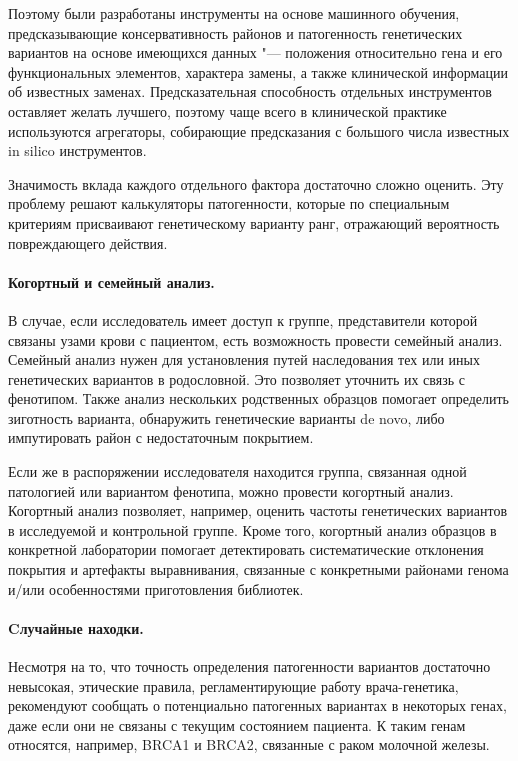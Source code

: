 \documentclass[a4paper,12pt]{article}
\begin{document}
\begin{enumerate}
Поэтому были разработаны инструменты на основе машинного обучения, предсказывающие консервативность районов и патогенность генетических вариантов на основе имеющихся данных "--- положения относительно гена и его функциональных элементов, характера замены, а также клинической информации об известных заменах\cite{brea-fernandez}.
Предсказательная способность отдельных инструментов оставляет желать лучшего, поэтому чаще всего в клинической практике используются агрегаторы, собирающие предсказания с большого числа известных in silico инструментов.
\end{enumerate}

Значимость вклада каждого отдельного фактора достаточно сложно оценить.
Эту проблему решают калькуляторы патогенности, которые по специальным критериям присваивают генетическому варианту ранг, отражающий вероятность повреждающего действия\cite{ryzhkova}.

\paragraph{Когортный и семейный анализ.}
В случае, если исследователь имеет доступ к группе, представители которой связаны узами крови с пациентом, есть возможность провести семейный анализ.
Семейный анализ нужен для установления путей наследования тех или иных генетических вариантов в родословной.
Это позволяет уточнить их связь с фенотипом.
Также анализ нескольких родственных образцов помогает определить зиготность варианта, обнаружить генетические варианты de novo, либо импутировать район с недостаточным покрытием.
 
Если же в распоряжении исследователя находится группа, связанная одной патологией или вариантом фенотипа, можно провести когортный анализ.
Когортный анализ позволяет, например, оценить частоты генетических вариантов в исследуемой и контрольной группе.
Кроме того, когортный анализ образцов в конкретной лаборатории помогает детектировать систематические отклонения покрытия и артефакты выравнивания, связанные с конкретными районами генома и/или особенностями приготовления библиотек.

\paragraph{Cлучайные находки.}
Несмотря на то, что точность определения патогенности вариантов достаточно невысокая, этические правила, регламентирующие работу врача-генетика, рекомендуют сообщать о потенциально патогенных вариантах в некоторых генах, даже если они не связаны с текущим состоянием пациента.
К таким генам относятся, например, BRCA1 и BRCA2, связанные с раком молочной железы.
\end{document}
